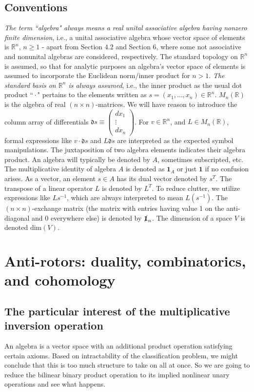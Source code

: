 \documentclass{amsart}
\numberwithin{equation}{section}
\theoremstyle{definition}
\numberwithin{theorem}{section}
\begin{document}
 
\subsection{Conventions}  {\it The term ``algebra" always means a real unital associative algebra having nonzero finite dimension}, i.e., a unital associative algebra whose vector space of elements is $\mathbb{R}^n$, $n\ge 1$ - apart from Section 4.2 and Section 6, where some not associative and nonunital algebras are considered, respectively.  The standard topology on $\mathbb{R}^n$ is assumed, so that for analytic purposes an algebra's vector space of elements is assumed to incorporate the Euclidean norm/inner product for $n>1$.  {\it The standard basis on $\mathbb{R}^n$ is always assumed}, i.e., the inner product as the usual dot product ``\,$\cdot$\," pertains to the elements written as $s=(x_1,\dots,x_n)\in\mathbb{R}^n$.  $M_n(\mathbb{R})$ is the algebra of real $(n\times n)$-matrices.  We will have reason to introduce the column array of differentials $\mathfrak{d}s \equiv \left(\begin{array}{ccc}
dx_1   \\ 
\vdots \\
dx_n   
\end{array}\right)$.  For $v\in\mathbb{R}^n$, and $L\in M_n(\mathbb{R})$, formal expressions like $v\cdot \mathfrak{d}s$ and $L\mathfrak{d}s$ are interpreted as the expected symbol manipulations.   The juxtaposition of two algebra elements indicates their algebra product.  An algebra will typically be denoted by $A$, sometimes subscripted, etc. The multiplicative identity of algebra $A$ is denoted as $\mathbf{1}_A$ or just $\mathbf{1}$ if no confusion arises.   As a vector, an element $s\in A$ has its dual vector denoted by $s^T$. The transpose of a linear operator $L$ is denoted by $L^T$.  To reduce clutter, we utilize expressions like $Ls^{-1}$, which are always interpreted to mean $L(s^{-1})$.  The $(n\times n)$-exchange matrix (the matrix with entries having value 1 on the anti-diagonal and 0 everywhere else) is denoted by  $\slashed{\bf 1}_n$.  The dimension of a space $V$ is denoted $\text{dim}(V)$.
 

 \section{Anti-rotors: duality, combinatorics, and cohomology} 

 \subsection{The particular interest of the multiplicative inversion operation} An algebra is a vector space with an additional product operation satisfying certain axioms.  Based on intractability of the classification problem, we might conclude that this is too much structure to take on all at once.  So we are going to reduce the bilinear binary product operation to its implied nonlinear unary operations and see what happens. 
 
\end{document}
